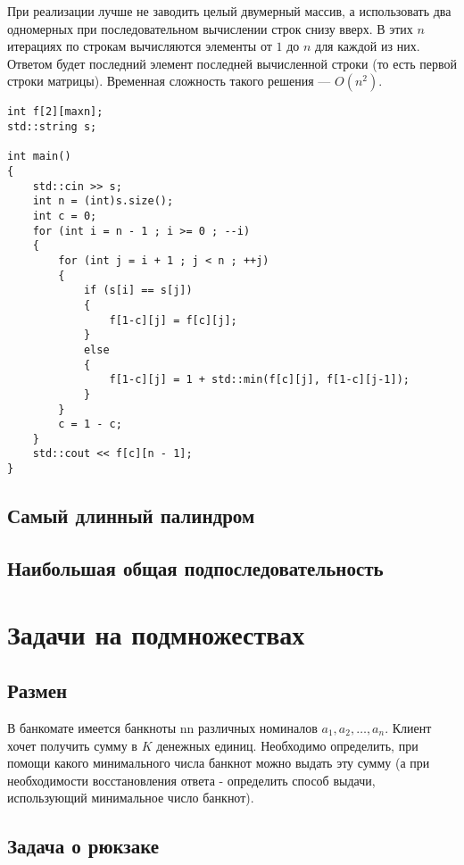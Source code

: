 \documentclass[14pt,openany]{book}
\begin{document}
При реализации лучше не заводить целый двумерный массив, а использовать два
одномерных при последовательном вычислении строк снизу вверх.
В этих $n$ итерациях по строкам вычисляются элементы от $1$ до $n$ для каждой из них.
Ответом будет последний элемент последней вычисленной строки (то есть первой строки
матрицы). Временная сложность такого решения --- $O(n^2)$.

\begin{lstlisting}
int f[2][maxn];
std::string s;

int main()
{
    std::cin >> s;
    int n = (int)s.size();
    int c = 0;
    for (int i = n - 1 ; i >= 0 ; --i)
    {
        for (int j = i + 1 ; j < n ; ++j)
        {
            if (s[i] == s[j])
            {
                f[1-c][j] = f[c][j];
            }
            else
            {
                f[1-c][j] = 1 + std::min(f[c][j], f[1-c][j-1]);
            }
        }
        c = 1 - c;
    }
    std::cout << f[c][n - 1];
}
\end{lstlisting}

\section{Самый длинный палиндром}

\section{Наибольшая общая подпоследовательность}


\chapter{Задачи на подмножествах}

\section{Размен}

В банкомате имеется банкноты nn различных номиналов $a_1, a_2, \ldots, a_n$. Клиент хочет получить сумму в $K$ денежных единиц. Необходимо определить, при помощи какого минимального числа банкнот можно выдать эту сумму (а при необходимости восстановления ответа - определить способ выдачи, использующий минимальное число банкнот).

\section{Задача о рюкзаке}
\end{document}
